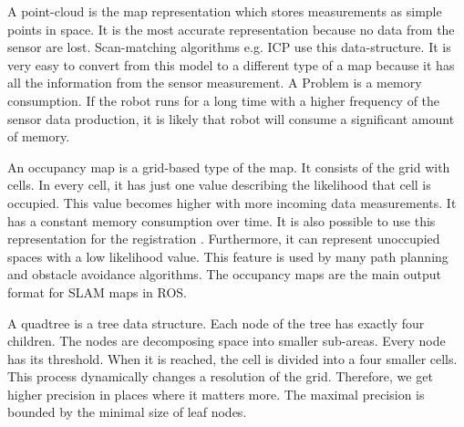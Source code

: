 A point-cloud \cite{pcl} is the map representation which stores measurements as simple points in space. It is the most accurate representation because no data from the sensor are lost. Scan-matching algorithms e.g. \gls{ICP} use this data-structure. It is very easy to convert from this model to a different type of a map because it has all the information from the sensor measurement. A Problem is a memory consumption. If the robot runs for a long time with a higher frequency of the sensor data production, it is likely that robot will consume a significant amount of memory.

An occupancy map is a grid-based type of the map. It consists of the grid with cells. In every cell, it has just one value describing the likelihood that cell is occupied. This value becomes higher with more incoming data measurements. It has a constant memory consumption over time. It is also possible to use this representation for the registration \cite{Hector}. Furthermore, it can represent unoccupied spaces with a low likelihood value. This feature is used by many path planning and obstacle avoidance algorithms.  The occupancy maps are the main output format for SLAM maps in ROS. 

A quadtree is a tree data structure. Each node of the tree has exactly four children. The nodes are decomposing space into smaller sub-areas. Every node has its threshold. When it is reached, the cell is divided into a four smaller cells. This process dynamically changes a resolution of the grid. Therefore, we get higher precision in places where it matters more. The maximal precision is bounded by the minimal size of leaf nodes.

